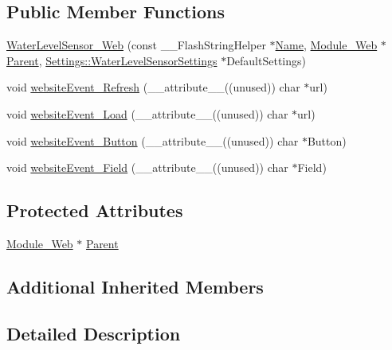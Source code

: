 \subsection*{Public Member Functions}
\begin{DoxyCompactItemize}
\item 
\hyperlink{class_water_level_sensor___web_a822380f4ecf477d16e6d535edff71848}{Water\+Level\+Sensor\+\_\+\+Web} (const \+\_\+\+\_\+\+Flash\+String\+Helper $\ast$\hyperlink{class_common_aeea91a726dbe988e515057b32ba0726f}{Name}, \hyperlink{class_module___web}{Module\+\_\+\+Web} $\ast$\hyperlink{class_water_level_sensor___web_af6804f9dcdd8e9fdbd47d13bac1d3373}{Parent}, \hyperlink{struct_settings_1_1_water_level_sensor_settings}{Settings\+::\+Water\+Level\+Sensor\+Settings} $\ast$Default\+Settings)
\item 
void \hyperlink{class_water_level_sensor___web_a8caf8178b0128bad72e78c1c662af5c0}{website\+Event\+\_\+\+Refresh} (\+\_\+\+\_\+attribute\+\_\+\+\_\+((unused)) char $\ast$url)
\item 
void \hyperlink{class_water_level_sensor___web_af4ed210d015bfc044c0c8398bdf6b21e}{website\+Event\+\_\+\+Load} (\+\_\+\+\_\+attribute\+\_\+\+\_\+((unused)) char $\ast$url)
\item 
void \hyperlink{class_water_level_sensor___web_af70800c309eaf938c8974f71a9c2d0e2}{website\+Event\+\_\+\+Button} (\+\_\+\+\_\+attribute\+\_\+\+\_\+((unused)) char $\ast$Button)
\item 
void \hyperlink{class_water_level_sensor___web_a4cce09a705011d6bdf685b5f2d3d771c}{website\+Event\+\_\+\+Field} (\+\_\+\+\_\+attribute\+\_\+\+\_\+((unused)) char $\ast$Field)
\end{DoxyCompactItemize}
\subsection*{Protected Attributes}
\begin{DoxyCompactItemize}
\item 
\hyperlink{class_module___web}{Module\+\_\+\+Web} $\ast$ \hyperlink{class_water_level_sensor___web_af6804f9dcdd8e9fdbd47d13bac1d3373}{Parent}
\end{DoxyCompactItemize}
\subsection*{Additional Inherited Members}


\subsection{Detailed Description}


